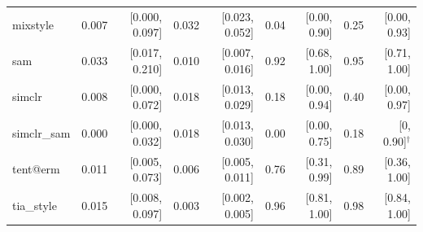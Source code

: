 \begin{tabular}{lrrrrrrrr}
mixstyle & 0.007 & [0.000, 0.097] & 0.032 & [0.023, 0.052] & 0.04 & [0.00, 0.90] & 0.25 & [0.00, 0.93] \\
sam & 0.033 & [0.017, 0.210] & 0.010 & [0.007, 0.016] & 0.92 & [0.68, 1.00] & 0.95 & [0.71, 1.00] \\
simclr & 0.008 & [0.000, 0.072] & 0.018 & [0.013, 0.029] & 0.18 & [0.00, 0.94] & 0.40 & [0.00, 0.97] \\
simclr\_sam & 0.000 & [0.000, 0.032] & 0.018 & [0.013, 0.030] & 0.00 & [0.00, 0.75] & 0.18 & [0, 0.90]$^\dagger$ \\
tent@erm & 0.011 & [0.005, 0.073] & 0.006 & [0.005, 0.011] & 0.76 & [0.31, 0.99] & 0.89 & [0.36, 1.00] \\
tia\_style & 0.015 & [0.008, 0.097] & 0.003 & [0.002, 0.005] & 0.96 & [0.81, 1.00] & 0.98 & [0.84, 1.00] \\
\bottomrule
\end{tabular}
